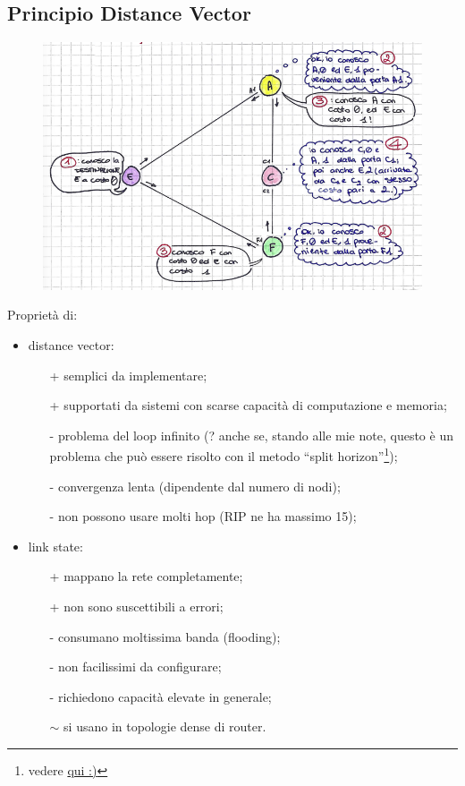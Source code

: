 \newpage
{}
\subsection*{Principio Distance Vector}
\begin{figure} [ht]
    \centering
    \includegraphics[width=0.8\linewidth]{Figures/05/distvec.png}
\end{figure}

\noindent Proprietà di:
\begin{itemize}
    \item distance vector:
    \begin{itemize}
        \item [+] semplici da implementare;
        \item [+] supportati da sistemi con scarse capacità di computazione e memoria;
        \item [-] problema del loop infinito (? anche se, stando alle mie note, questo è un problema che può essere risolto con il metodo ``split horizon''\footnote{vedere \href{https://www.techtarget.com/searchnetworking/definition/split-horizon}{qui :)}});
        \item [-] convergenza lenta (dipendente dal numero di nodi);
        \item [-] non possono usare molti hop (RIP ne ha massimo 15);
    \end{itemize}
    \item link state:
    \begin{itemize}
        \item [+] mappano la rete completamente;
        \item [+] non sono suscettibili a errori;
        \item [-] consumano moltissima banda (flooding);
        \item [-] non facilissimi da configurare;
        \item [-] richiedono capacità elevate in generale;
        \item [$\sim$] si usano in topologie dense di router.
    \end{itemize}
\end{itemize}

